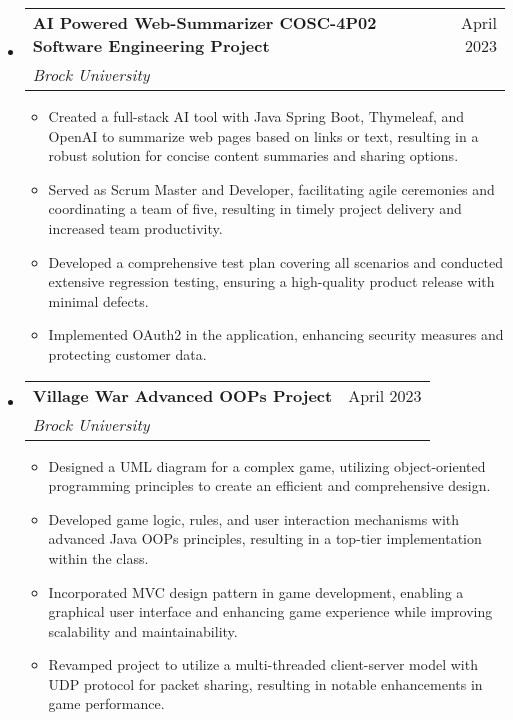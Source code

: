 \documentclass[letterpaper,11pt]{article}
\makeatletter
\newcommand{\resumeItem}[1]{
  \item\small{
    {#1 \vspace{-2pt}}
  }
}
\newcommand{\resumeSubheading}[4]{
  \vspace{-2pt}\item
    \begin{tabular*}{0.97\textwidth}[t]{l@{\extracolsep{\fill}}r}
      \textbf{#1} & #2 \\
      \textit{\small#3} & \textit{\small #4} \\
    \end{tabular*}\vspace{-7pt}
}
\newcommand{\resumeSubHeadingListStart}{\begin{itemize}[leftmargin=0.15in, label={}]}
\newcommand{\resumeSubHeadingListEnd}{\end{itemize}}
\newcommand{\resumeItemListStart}{\begin{itemize}}
\newcommand{\resumeItemListEnd}{\end{itemize}\vspace{-5pt}}
\makeatother
\begin{document}
\begin{center}
\resumeSubHeadingListStart
  \resumeSubheading
    {AI Powered Web-Summarizer COSC-4P02 Software Engineering Project}{April 2023}
    {Brock University}{}
    \resumeItemListStart
    \resumeItem{Created a full-stack AI tool with Java Spring Boot, Thymeleaf, and OpenAI to summarize web pages based on links or text, resulting in a robust solution for concise content summaries and sharing options.}
      \resumeItem{Served as Scrum Master and Developer, facilitating agile ceremonies and coordinating a team of five, resulting in timely project delivery and increased team productivity.}
      \resumeItem{Developed a comprehensive test plan covering all scenarios and conducted extensive regression testing, ensuring a high-quality product release with minimal defects.}
      \resumeItem{Implemented OAuth2 in the application, enhancing security measures and protecting customer data.}
    \resumeItemListEnd
\resumeSubHeadingListEnd

\resumeSubHeadingListStart
  \resumeSubheading
    {Village War Advanced OOPs Project}{April 2023}
    {Brock University}{}
    \resumeItemListStart
      \resumeItem{Designed a UML diagram for a complex game, utilizing object-oriented programming principles to create an efficient and comprehensive design.}
      \resumeItem{Developed game logic, rules, and user interaction mechanisms with advanced Java OOPs principles, resulting in a top-tier implementation within the class.}
      \resumeItem{Incorporated MVC design pattern in game development, enabling a graphical user interface and enhancing game experience while improving scalability and maintainability.}
      \resumeItem{Revamped project to utilize a multi-threaded client-server model with UDP protocol for packet sharing, resulting in notable enhancements in game performance.}
    \resumeItemListEnd
\resumeSubHeadingListEnd
\end{center}
\end{document}
